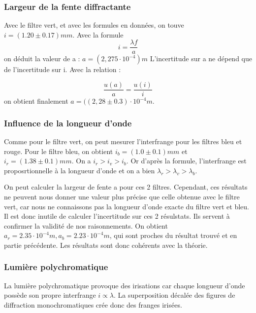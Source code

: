 \documentclass[a4paper,9pt,french]{scrartcl}
\begin{document}
\subsubsection{Largeur de la fente diffractante}
Avec le filtre vert, et avec les formules en données, on touve \(i = (1.20\pm0.17)mm\). Avec la formule \begin{equation}
                                                                                                         i = \frac{\lambda f}{a}
                                                                                                        \end{equation}
                                                                                                        on déduit la valeur de a : \(a=(2,275\cdot 10^{-4}) m\)
L'incertitude sur a ne dépend que de l'incertitude sur i. Avec la relation :

\begin{equation}\frac{u(a)}{a} = \frac{u(i)}{i}\end{equation}
on obtient finalement \(a=((2,28\pm0.3)\cdot 10^{-4} m\).
\subsubsection{Influence de la longueur d'onde}
Comme pour le filtre vert, on peut mesurer l'interfrange pour les filtres bleu et rouge. Pour le filtre bleu, on obtient \(i_b = (1.0\pm 0.1)mm\) et \(i_r = (1.38\pm 0.1)mm\). On a \(i_r>i_v>i_b\). Or d'après la formule, l'interfrange est proposrtionnelle à la longueur d'onde et on a bien \(\lambda_r>\lambda_v>\lambda_b\).

On peut calculer la largeur de fente a pour ces 2 filtres. Cependant, ces résultats ne peuvent nous donner une valeur plus précise que celle obtenue avec le filtre vert, car nous ne connaissons pas la longueur d'onde exacte du filtre vert et bleu. Il est donc inutile de calculer l'incertitude sur ces 2 résulstats. Ils servent à confirmer la validité de nos raisonnements. On obtient \(a_r = 2.35\cdot 10^{-4}m, a_b = 2.23\cdot 10^{-4}m\), qui sont proches du résultat trouvé et en partie précédente. Les résultats sont donc cohérents avec la théorie.
\subsubsection{Lumière polychromatique}
La lumière polychromatique provoque des irisations car chaque longueur d'onde possède son propre interfrange \(i\propto \lambda\). La superposition décalée des figures de diffraction monochromatiques crée donc des franges irisées.
\end{document}
